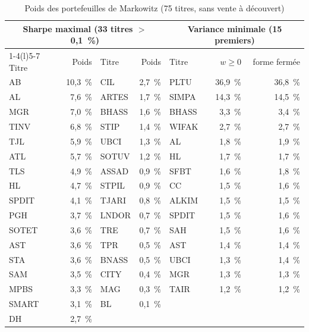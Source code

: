 \begin{table}[H]\centering\small\caption{Poids des portefeuilles de Markowitz (75 titres, sans vente à découvert)}\label{tab:annexe-poids}
\begin{tabular}{lr@{\hspace{1.2cm}}lr@{\hspace{1.2cm}}lrr}\toprule
\multicolumn{4}{c}{Sharpe maximal (33 titres $>$ 0,1~\%)} & \multicolumn{3}{c}{Variance minimale (15 premiers)}\\ \cmidrule(r){1-4}\cmidrule(l){5-7}
Titre & Poids & Titre & Poids & Titre & $w \geq 0$ & forme fermée \\ \midrule
AB & 10{,}3~\% & CIL & 2{,}7~\% & PLTU & 36{,}9~\% & 36{,}8~\% \\
AL & 7{,}6~\% & ARTES & 1{,}7~\% & SIMPA & 14{,}3~\% & 14{,}5~\% \\
MGR & 7{,}0~\% & BHASS & 1{,}6~\% & BHASS & 3{,}3~\% & 3{,}4~\% \\
TINV & 6{,}8~\% & STIP & 1{,}4~\% & WIFAK & 2{,}7~\% & 2{,}7~\% \\
TJL & 5{,}9~\% & UBCI & 1{,}3~\% & AL & 1{,}8~\% & 1{,}9~\% \\
ATL & 5{,}7~\% & SOTUV & 1{,}2~\% & HL & 1{,}7~\% & 1{,}7~\% \\
TLS & 4{,}9~\% & ASSAD & 0{,}9~\% & SFBT & 1{,}6~\% & 1{,}8~\% \\
HL & 4{,}7~\% & STPIL & 0{,}9~\% & CC & 1{,}5~\% & 1{,}6~\% \\
SPDIT & 4{,}1~\% & TJARI & 0{,}8~\% & ALKIM & 1{,}5~\% & 1{,}5~\% \\
PGH & 3{,}7~\% & LNDOR & 0{,}7~\% & SPDIT & 1{,}5~\% & 1{,}6~\% \\
SOTET & 3{,}6~\% & TRE & 0{,}7~\% & SAH & 1{,}5~\% & 1{,}6~\% \\
AST & 3{,}6~\% & TPR & 0{,}5~\% & AST & 1{,}4~\% & 1{,}4~\% \\
STA & 3{,}6~\% & BNASS & 0{,}5~\% & UBCI & 1{,}3~\% & 1{,}4~\% \\
SAM & 3{,}5~\% & CITY & 0{,}4~\% & MGR & 1{,}3~\% & 1{,}3~\% \\
MPBS & 3{,}3~\% & MAG & 0{,}3~\% & TAIR & 1{,}2~\% & 1{,}2~\% \\
SMART & 3{,}1~\% & BL & 0{,}1~\% &  & &  \\
DH & 2{,}7~\% &  &  &  & &  \\
\bottomrule\end{tabular}\end{table}